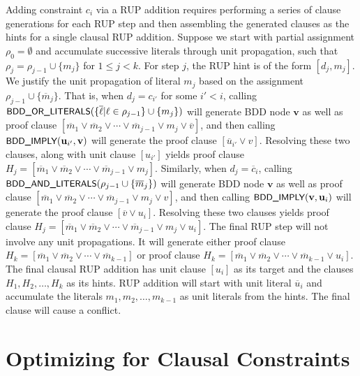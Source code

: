 \documentclass{easychair}
\renewcommand{\obar}[1]{\overline{#1}}
\newcommand{\lit}{\ell}
\newcommand{\mlit}{m}
\newcommand{\assign}{\rho}
\newcommand{\fname}[1]{\mbox{\small\sf #1}}
\newcommand{\node}[1]{\mathbf{#1}}
\newcommand{\nodeu}{\node{u}}
\newcommand{\nodev}{\node{v}}
\begin{document}
Adding constraint $c_i$ via a RUP addition requires
performing a series of clause generations for each RUP step and then assembling the generated clauses as the hints for a single clausal RUP addition.
Suppose we start with partial assignment $\assign_0 = \emptyset$
and accumulate successive literals through unit
propagation, such that $\assign_j = \assign_{j-1} \cup \{ \mlit_j \}$ for $1 \leq j < k$.
For step $j$, the RUP hint is of the form $[d_j, \mlit_j]$.  We
justify the unit propagation of literal $\mlit_j$ based on the
assignment
$\assign_{j-1} \cup \{ \obar{\mlit}_{j} \}$.
That is, when $d_j = c_{i'}$ for some $i' < i$, calling
$\fname{BDD\_OR\_LITERALS}(\{ \obar{\lit} | \lit \in \assign_{j-1} \} \cup \{ \mlit_j \})$ will generate BDD node $\nodev$
as well as proof clause
$[\obar{\mlit}_1 \lor \obar{\mlit}_2 \lor \cdots \lor  \obar{\mlit}_{j-1} \lor \mlit_j \lor \obar{v}]$,
and then calling $\fname{BDD\_IMPLY}(\nodeu_{i'}, \nodev)$
  will generate the proof clause $[\obar{u}_{i'} \lor v]$.  Resolving these two clauses, along with unit clause $[u_{i'}]$
yields proof clause
$H_j = [\obar{\mlit}_1 \lor  \obar{\mlit}_2 \lor \cdots \lor \obar{\mlit}_{j-1} \lor \mlit_j]$.
  Similarly, when
$d_j = \overline{c}_i$, calling
$\fname{BDD\_AND\_LITERALS}(\assign_{j-1} \cup \{ \obar{\mlit}_j \})$ will generate BDD node $\nodev$
as well as proof clause
$[\obar{\mlit}_1 \lor \obar{\mlit}_2 \lor \cdots \lor  \obar{\mlit}_{j-1} \lor \mlit_j \lor v]$,
and then calling $\fname{BDD\_IMPLY}(\nodev, \nodeu_i)$
  will generate the proof clause $[\obar{v} \lor u_i]$.  Resolving these two clauses
yields proof clause
$H_j = [\obar{\mlit}_1 \lor  \obar{\mlit}_2 \lor \cdots \lor \obar{\mlit}_{j-1} \lor \mlit_j \lor u_i]$.
The final RUP step will not involve any unit propagations.  It will generate either proof clause
$H_k = [\obar{\mlit}_1 \lor  \obar{\mlit}_2 \lor \cdots \lor \obar{\mlit}_{k-1}]$ or proof clause
$H_k = [\obar{\mlit}_1 \lor  \obar{\mlit}_2 \lor \cdots \lor \obar{\mlit}_{k-1} \lor u_i]$.
The
final clausal RUP addition has unit clause $[u_i]$ as its target
and the clauses $H_1, H_2, \ldots, H_k$ as its hints.
RUP addition will start with unit literal $\obar{u}_i$ and accumulate the literals 
$\mlit_1, \mlit_2, \ldots, \mlit_{k-1}$ as unit literals from the hints.
The final clause will cause a conflict.

\section{Optimizing for Clausal Constraints}
\end{document}
